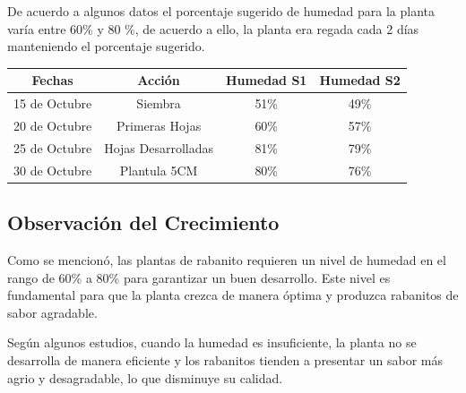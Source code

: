 \documentclass[conference]{IEEEtran}
\begin{document}
	De acuerdo a algunos datos el porcentaje sugerido de humedad para la planta varía entre 60\% y 80 \%, de acuerdo a ello, la planta era regada cada 2 días manteniendo el porcentaje sugerido.
	
	\begin{table}[]
		\centering
		\begin{tabular}{|c|c|c|c|}
			\hline
			\textbf{Fechas} & \textbf{Acción}     & \textbf{Humedad S1} & \textbf{Humedad S2} \\ \hline
			15 de Octubre   & Siembra             & 51\%                & 49\%                \\ \hline
			20 de Octubre   & Primeras Hojas      & 60\%                & 57\%                \\ \hline
			25 de Octubre   & Hojas Desarrolladas & 81\%                & 79\%                \\ \hline
			30 de Octubre   & Plantula 5CM        & 80\%                & 76\%                \\ \hline
		\end{tabular}
	\end{table}
	
	\subsection{Observación del Crecimiento}
	Como se mencionó, las plantas de rabanito requieren un nivel de humedad en el rango de 60\% a 80\% para garantizar un buen desarrollo. Este nivel es fundamental para que la planta crezca de manera óptima y produzca rabanitos de sabor agradable.
	
	Según algunos estudios, cuando la humedad es insuficiente, la planta no se desarrolla de manera eficiente y los rabanitos tienden a presentar un sabor más agrio y desagradable, lo que disminuye su calidad.
	
\end{document}
